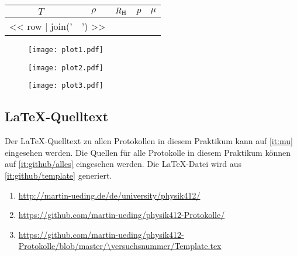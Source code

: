 \begin{table}[htbp]
    \centering
    \begin{tabular}{SSSSS}
        {$T$} &
        {$\rho$} &
        {$R_\text H$} &
        {$p$} &
        {$\mu$} \\
        \midrule
        << row | join(' & ') >> \\
    \end{tabular}
    \caption{%
    }
    \label{tab:temperatur_tabelle}
\end{table}

\begin{figure}[htbp]
    \centering
    \texttt{[image: plot1.pdf]}
    \caption{%
    }
    \label{fig:}
\end{figure}

\begin{figure}[htbp]
    \centering
    \texttt{[image: plot2.pdf]}
    \caption{%
    }
    \label{fig:}
\end{figure}

\begin{figure}[htbp]
    \centering
    \texttt{[image: plot3.pdf]}
    \caption{%
    }
    \label{fig:}
\end{figure}


\FloatBarrier
\begin{appendix}
    \FloatBarrier
    \chapter{\LaTeX-Quelltext}

    Der \LaTeX-Quelltext zu allen Protokollen in diesem Praktikum kann auf
    \ref{it:mu} eingesehen werden. Die Quellen für alle Protokolle in diesem
    Praktikum können auf \ref{it:github/alles} eingesehen werden. Die
    \LaTeX-Datei wird aus \ref{it:github/template} generiert.

    \begin{enumerate}
        \item
            \label{it:mu}
            \url{http://martin-ueding.de/de/university/physik412/}
        \item
            \label{it:github/alles}
            \url{https://github.com/martin-ueding/physik412-Protokolle/}
        \item
            \label{it:github/template}
            \url{https://github.com/martin-ueding/physik412-Protokolle/blob/master/\versuchsnummer/Template.tex}
    \end{enumerate}
\end{appendix}

